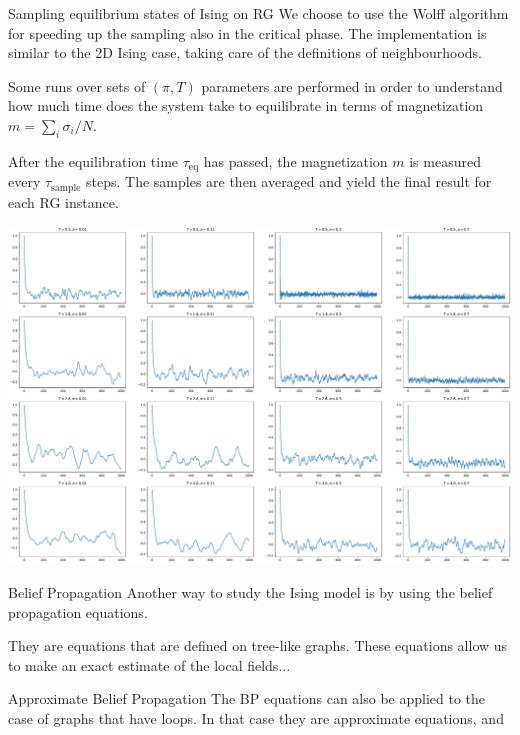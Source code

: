 \documentclass[handout]{beamer}
\begin{document}
\begin{frame}{Sampling equilibrium states of Ising on RG}
    We choose to use the \alert{Wolff algorithm} for speeding up the sampling
    also in the critical phase. The implementation is similar to the 2D Ising
    case, taking care of the definitions of neighbourhoods.

    Some runs over sets of $(\pi, T)$ parameters are performed in order to
    understand how much time does the system take to equilibrate in terms of
    magnetization $m=\sum_i \sigma_i / N$.

    After the equilibration time $\tau_{\text{eq}}$ has passed, the
    magnetization $m$ is measured every $\tau_{\text{sample}}$ steps. The
    samples are then averaged and yield the final result for each RG instance.
\end{frame}

\begin{frame}[plain]
    \includegraphics[width=\textwidth]{wolff_mags}
\end{frame}

\begin{frame}{Belief Propagation}
    Another way to study the Ising model is by using the \alert{belief
    propagation} equations.

    They are equations that are defined on tree-like graphs. These equations
    allow us to make an exact estimate of the local fields...
\end{frame}

\begin{frame}{Approximate Belief Propagation}
    The BP equations can also be applied to the case of graphs that have loops.
    In that case they are approximate equations, and
\end{frame}
\end{document}
